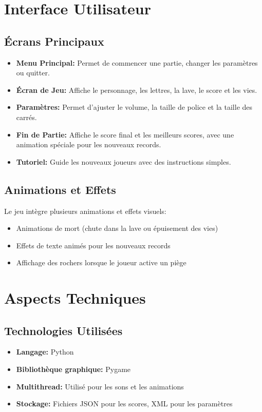 \documentclass{article}
\begin{document}
\section{Interface Utilisateur}

\subsection{Écrans Principaux}
\begin{itemize}
    \item \textbf{Menu Principal:} Permet de commencer une partie, changer les paramètres ou quitter.
    \item \textbf{Écran de Jeu:} Affiche le personnage, les lettres, la lave, le score et les vies.
    \item \textbf{Paramètres:} Permet d'ajuster le volume, la taille de police et la taille des carrés.
    \item \textbf{Fin de Partie:} Affiche le score final et les meilleurs scores, avec une animation spéciale pour les nouveaux records.
    \item \textbf{Tutoriel:} Guide les nouveaux joueurs avec des instructions simples.
\end{itemize}

\subsection{Animations et Effets}
Le jeu intègre plusieurs animations et effets visuels:
\begin{itemize}
    \item Animations de mort (chute dans la lave ou épuisement des vies)
    \item Effets de texte animés pour les nouveaux records
    \item Affichage des rochers lorsque le joueur active un piège
\end{itemize}

\section{Aspects Techniques}

\subsection{Technologies Utilisées}
\begin{itemize}
    \item \textbf{Langage:} Python
    \item \textbf{Bibliothèque graphique:} Pygame
    \item \textbf{Multithread:} Utilisé pour les sons et les animations
    \item \textbf{Stockage:} Fichiers JSON pour les scores, XML pour les paramètres
\end{itemize}
\end{document}
